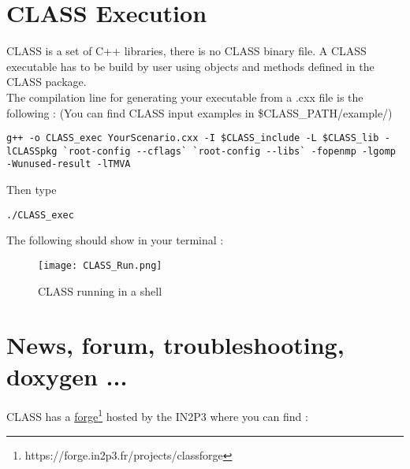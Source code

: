 \chapter{CLASS Execution}
CLASS is a set of C++ libraries, there is no CLASS binary file. A CLASS executable has to be build by user using objects and methods defined in the CLASS package. \\
The compilation line for generating your executable from a .cxx file is the following :
(You can find CLASS input examples in \$CLASS\_PATH/example/)

\begin{center}
\begin{minipage}{\textwidth}
\begin{lstlisting}[style=terminal]
g++ -o CLASS_exec YourScenario.cxx -I $CLASS_include -L $CLASS_lib -lCLASSpkg `root-config --cflags` `root-config --libs` -fopenmp -lgomp -Wunused-result -lTMVA
\end{lstlisting}
\end{minipage}
\end{center}
Then type 
\begin{center}
\begin{minipage}{\textwidth}
\begin{lstlisting}[style=terminal]
./CLASS_exec
\end{lstlisting}
\end{minipage}
\end{center}

The following should show in your terminal :

    \begin{figure}[H]
    \centering
    \centerline{\texttt{[image: CLASS\_Run.png]}}
    \caption{CLASS running in a shell}
    \label{fig:CLASSRUN}
    \end{figure}




\chapter{News, forum, troubleshooting, doxygen ...}
CLASS has a \href{https://forge.in2p3.fr/projects/classforge}{forge}\footnote{https://forge.in2p3.fr/projects/classforge} hosted by the IN2P3  where you can find :

